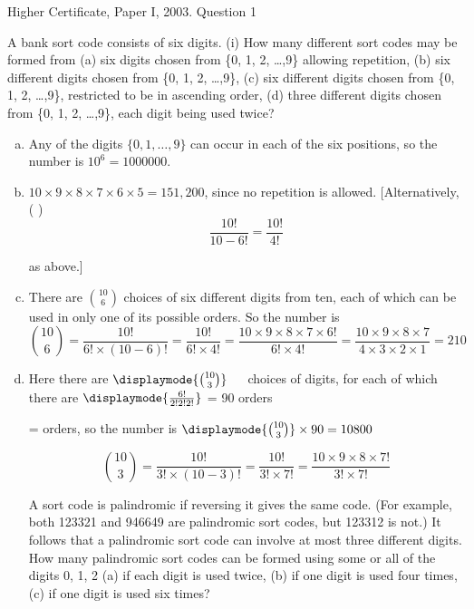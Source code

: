 \documentclass[a4paper,12pt]{article}
\begin{document}
Higher Certificate, Paper I, 2003. Question 1
\begin{framed}
A bank sort code consists of six digits.
(i) How many different sort codes may be formed from
(a) six digits chosen from \{0, 1, 2, \ldots,9\} allowing repetition,
(b) six different digits chosen from \{0, 1, 2, \ldots,9\},
(c) six different digits chosen from \{0, 1, 2, \ldots,9\}, restricted to be in
ascending order,
(d) three different digits chosen from \{0, 1, 2, \ldots,9\}, each digit being used
twice?
\end{framed}


\begin{enumerate}[(a)]
\item Any of the digits $\{0, 1, \ldots, 9\}$ can occur in each of the six positions, so the number
is $10^6 = 1000000$.
\item $10 \times 9 \times 8 \times 7 \times 6 \times 5 = 151,200$, since no repetition is allowed.
[Alternatively, ( )
\[\frac{10!}{10- 6 !} =  \frac{10!}{4!}\] 

as above.]
\item There are ${10 \choose 6}$
choices of six different digits from ten, each of which
can be used in only one of its possible orders. So the number is
\[ {10 \choose 6} = \frac{10!}{6! \times (10-6)!} = \frac{10!}{6! \times 4!}
= \frac{10 \times 9 \times 8 \times 7 \times 6!}{6! \times 4!} = \frac{10 \times 9 \times 8 \times 7}{4 \times 3 \times 2 \times 1} = 210\]


\item  Here there are $ \displaymode{{10 \choose 3}}$
 
choices of digits, for each of which there are
$ \displaymode{\frac{6!}{2!2!2!}}$ = 90 orders

= orders, so the number is
$ \displaymode{{10 \choose 3}} \times 90 = \mbox{10800}$
 


\[ {10 \choose 3} = \frac{10!}{3! \times (10-3)!} = \frac{10!}{3! \times 7!}
= \frac{10 \times 9 \times 8 \times 7! }{3! \times 7!}\]

\newpage
\begin{framed}
A sort code is palindromic if reversing it gives the same code. (For example,
both 123321 and 946649 are palindromic sort codes, but 123312 is not.) It
follows that a palindromic sort code can involve at most three different digits.
How many palindromic sort codes can be formed using some or all of the
digits 0, 1, 2
(a) if each digit is used twice,
(b) if one digit is used four times,
(c) if one digit is used six times?


\end{framed}
\end{enumerate}
\end{document}
